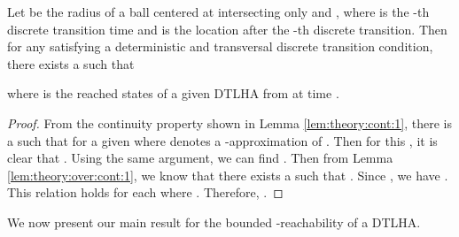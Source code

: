 \begin{lem} \label{lem:theory:over:cont:2}
Let  be the radius of a ball centered at  intersecting only  and , where  is the -th discrete transition time and  is the location after the -th discrete transition. Then for any  satisfying a deterministic and transversal discrete transition condition, there exists a  such that

where  is the reached states of a given DTLHA  from  at time .
\end{lem}
\begin{proof}
From the continuity property shown in Lemma \ref{lem:theory:cont:1}, there is a  such that    for a given  where  denotes a -approximation of .
Then for this , it is clear that   .
Using the same argument, we can find .
Then from Lemma \ref{lem:theory:over:cont:1}, we know that there exists a  such that   .
Since   , we have   .
This relation holds for each  where .
Therefore,   . 
\end{proof}


We now present our main result for the bounded -reachability of a DTLHA.

